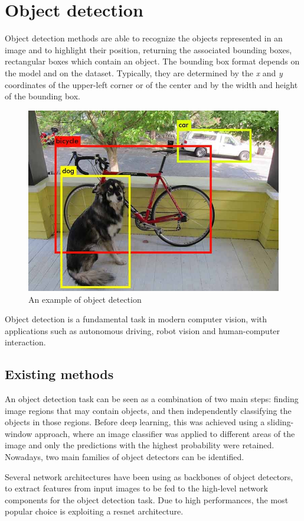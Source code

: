 \documentclass[%
    corpo=12pt,
    twoside,
    stile=classica,   
    tipotesi=magistrale,
    evenboxes,
    english,
	numerazioneromana,
]{toptesi}
\begin{document}
\section{Object detection}\label{sec:detection}
Object detection methods are able to recognize the objects represented in an image and to highlight their position, returning the associated bounding boxes, rectangular boxes which contain an object. The bounding box format depends on the model and on the dataset. Typically, they are determined by the \textit{x} and \textit{y} coordinates of the upper-left corner
or of the center
and by the width and height of the bounding box.

\begin{figure}[ht]
	\centering
	\includegraphics[width=.65\textwidth]{imgs/yolo_detection.png}
	\caption{An example of object detection\cite{redmon2016look}}
\end{figure}

Object detection is a fundamental task in modern computer vision, with applications such as autonomous driving, robot vision and human-computer interaction.

\subsection{Existing methods}\label{sec:detectors}
An object detection task can be seen as a combination of two main steps: finding image regions that may contain objects, and then independently classifying the objects in those regions. Before deep learning, this was achieved using a sliding-window approach, where an image classifier was applied to different areas of the image and only the predictions with the highest probability were retained. Nowadays, two main families of object detectors can be identified.

\bigskip
Several network architectures have been using as backbones of object detectors, to extract features from input images to be fed to the high-level network components for the object detection task. Due to high performances, the most popular choice is exploiting a \gls{resnet} architecture\cite{he2015deep}.
\end{document}
